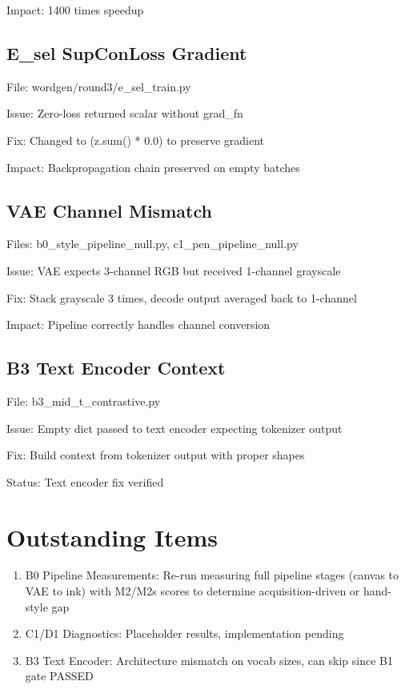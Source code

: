 \documentclass[12pt,a4paper]{article}
\begin{document}
Impact: 1400 times speedup

\subsection{E\_sel SupConLoss Gradient}

File: wordgen/round3/e\_sel\_train.py

Issue: Zero-loss returned scalar without grad\_fn

Fix: Changed to (z.sum() * 0.0) to preserve gradient

Impact: Backpropagation chain preserved on empty batches

\subsection{VAE Channel Mismatch}

Files: b0\_style\_pipeline\_null.py, c1\_pen\_pipeline\_null.py

Issue: VAE expects 3-channel RGB but received 1-channel grayscale

Fix: Stack grayscale 3 times, decode output averaged back to 1-channel

Impact: Pipeline correctly handles channel conversion

\subsection{B3 Text Encoder Context}

File: b3\_mid\_t\_contrastive.py

Issue: Empty dict passed to text encoder expecting tokenizer output

Fix: Build context from tokenizer output with proper shapes

Status: Text encoder fix verified

\section{Outstanding Items}

\begin{enumerate}
  \item B0 Pipeline Measurements: Re-run measuring full pipeline stages (canvas to VAE to ink)
  with M2/M2s scores to determine acquisition-driven or hand-style gap
  \item C1/D1 Diagnostics: Placeholder results, implementation pending
  \item B3 Text Encoder: Architecture mismatch on vocab sizes, can skip since B1 gate PASSED
\end{enumerate}
\end{document}
